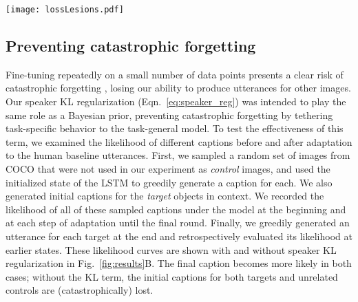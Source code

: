 %
%

\begin{figure*}[t]
\centering
\texttt{[image: lossLesions.pdf]}
\caption{Lesions reveal the contributions of each loss term. Error bars and ribbons are bootstrapped 95\% CIs.}
\label{fig:results}
\end{figure*}

\subsection{Preventing catastrophic forgetting}
Fine-tuning repeatedly on a small number of data points presents a clear risk of catastrophic forgetting \cite{robins_catastrophic_1995}, losing our ability to produce utterances for other images. %
Our speaker KL regularization (Eqn.~\ref{eq:speaker_reg}) was intended to play the same role as a Bayesian prior, preventing catastrophic forgetting by tethering task-specific behavior to the task-general model.
To test the effectiveness of this term, we examined the likelihood of different captions before and after adaptation to the human baseline utterances. 
First, we sampled a random set of images from COCO that were not used in our experiment as \emph{control} images, and used the initialized state of the LSTM to greedily generate a caption for each.
We also generated initial captions for the \emph{target} objects in context. %
We recorded the likelihood of all of these sampled captions under the model at the beginning and at each step of adaptation until the final round. 
Finally, we greedily generated an utterance for each target at the end and retrospectively evaluated its likelihood at earlier states.
These likelihood curves are shown with and without speaker KL regularization in Fig.~\ref{fig:results}B.
The final caption becomes more likely in both cases; without the KL term, the initial captions for both targets and unrelated controls are (catastrophically) lost.
 
